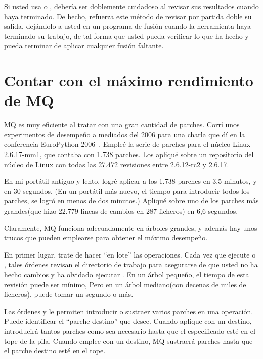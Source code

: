 Si usted usa  o , debería ser
doblemente cuidadoso al revisar sus resultados cuando haya terminado.
De hecho,  refuerza este método de revisar por partida
doble su salida, dejándolo a usted en un programa de fusión cuando la
herramienta haya terminado su trabajo, de tal forma que usted pueda
verificar lo que ha hecho y pueda terminar de aplicar cualquier fusión
faltante.

\section{Contar con el máximo rendimiento de MQ}
\label{sec:mq:perf}

MQ es muy eficiente al tratar con una gran cantidad de parches.  Corrí
unos experimentos de desempeño a mediados del 2006 para una charla que
dí en la conferencia EuroPython 2006~\cite{web:europython}.  Empleé la
serie de parches para el núcleo Linux 2.6.17-mm1, que contaba con 1.738
parches.  Los apliqué sobre un repositorio del núcleo de Linux con
todas las 27.472 revisiones entre 2.6.12-rc2 y 2.6.17.

En mi portátil antiguo y lento, logré aplicar 
 a los 1.738 parches en 3.5
minutos, y  en 30 segundos.
(En un portátil más nuevo, el tiempo para introducir todos los
parches, se logró en menos de dos minutos.)  Apliqué
 sobre uno de los parches más grandes(que hizo
22.779 líneas de cambios en 287 ficheros) en 6,6 segundos.

Claramente, MQ funciona adecuadamente en árboles grandes, y además hay
unos trucos que pueden emplearse para obtener el máximo desempeño.

En primer lugar, trate de hacer ``en lote'' las operaciones.  Cada vez
que ejecute  o , tales órdenes
revisan el directorio de trabajo para asegurarse de que usted no ha
hecho cambios y ha olvidado ejecutar .  En un
árbol pequeño, el tiempo de esta revisión puede ser mínimo,  Pero en
un árbol mediano(con decenas de miles de ficheros), puede tomar un
segundo o más.

Las órdenes  y  le permiten
introducir o sustraer varios parches en una operación.  Puede
identificar el ``parche destino'' que desee.  Cuando aplique
 con un destino, introducirá tantos parches como sea
necesario hasta que el especificado esté en el tope de la pila.
Cuando emplee  con un destino, MQ sustraerá parches
hasta que el parche destino esté en el tope.

